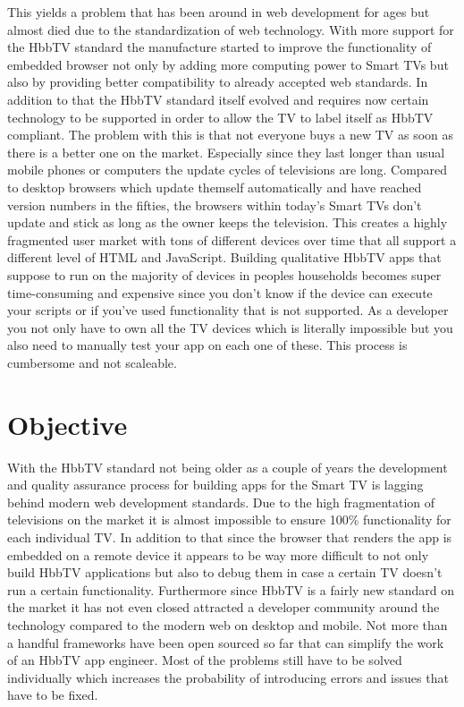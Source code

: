 This yields a problem that has been around in web development for ages but almost died due to the standardization of web technology. With more support for the HbbTV standard the manufacture started to improve the functionality of embedded browser not only by adding more computing power to Smart TVs but also by providing better compatibility to already accepted web standards. In addition to that the HbbTV standard itself evolved and requires now certain technology to be supported in order to allow the TV to label itself as HbbTV compliant. The problem with this is that not everyone buys a new TV as soon as there is a better one on the market. Especially since they last longer than usual mobile phones or computers the update cycles of televisions are long. Compared to desktop browsers which update themself automatically and have reached version numbers in the fifties, the browsers within today's Smart TVs don't update and stick as long as the owner keeps the television. This creates a highly fragmented user market with tons of different devices over time that all support a different level of HTML and JavaScript. Building qualitative HbbTV apps that suppose to run on the majority of devices in peoples households becomes super time-consuming and expensive since you don't know if the device can execute your scripts or if you've used functionality that is not supported. As a developer you not only have to own all the TV devices which is literally impossible but you also need to manually test your app on each one of these. This process is cumbersome and not scaleable.

\section{Objective\label{sec:objective}}

With the HbbTV standard not being older as a couple of years the development and quality assurance process for building apps for the Smart TV is lagging behind modern web development standards. Due to the high fragmentation of televisions on the market it is almost impossible to ensure 100\% functionality for each individual TV. In addition to that since the browser that renders the app is embedded on a remote device it appears to be way more difficult to not only build HbbTV applications but also to debug them in case a certain TV doesn't run a certain functionality. Furthermore since HbbTV is a fairly new standard on the market it has not even closed attracted a developer community around the technology compared to the modern web on desktop and mobile. Not more than a handful frameworks have been open sourced so far that can simplify the work of an HbbTV app engineer. Most of the problems still have to be solved individually which increases the probability of introducing errors and issues that have to be fixed.

